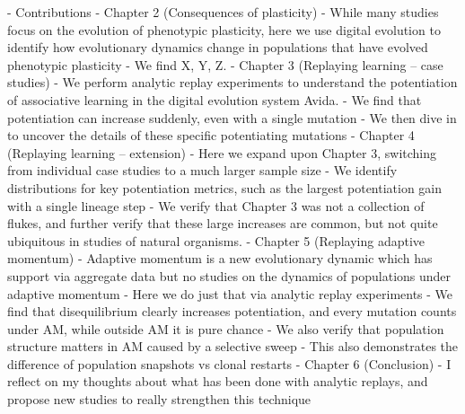 - Contributions
    - Chapter 2 (Consequences of plasticity)
        - While many studies focus on the evolution of phenotypic plasticity, here we use digital evolution to identify how evolutionary dynamics change in populations that have evolved phenotypic plasticity
            - We find X, Y, Z. 
    - Chapter 3 (Replaying learning -- case studies)
        - We perform analytic replay experiments to understand the potentiation of associative learning in the digital evolution system Avida. 
            - We find that potentiation can increase suddenly, even with a single mutation
                - We then dive in to uncover the details of these specific potentiating mutations
    - Chapter 4 (Replaying learning -- extension)
        - Here we expand upon Chapter 3, switching from individual case studies to a much larger sample size
            - We identify distributions for key potentiation metrics, such as the largest potentiation gain with a single lineage step
                - We verify that Chapter 3 was not a collection of flukes, and further verify that these large increases are common, but not quite ubiquitous in studies of natural organisms. 
    - Chapter 5 (Replaying adaptive momentum)
        - Adaptive momentum is a new evolutionary dynamic which has support via aggregate data but no studies on the dynamics of populations under adaptive momentum
            - Here we do just that via analytic replay experiments
                - We find that disequilibrium clearly increases potentiation, and every mutation counts under AM, while outside AM it is pure chance
                - We also verify that population structure matters in AM caused by a selective sweep
            - This also demonstrates the difference of population snapshots vs clonal restarts 
    - Chapter 6 (Conclusion)
        - I reflect on my thoughts about what has been done with analytic replays, and propose new studies to really strengthen this technique